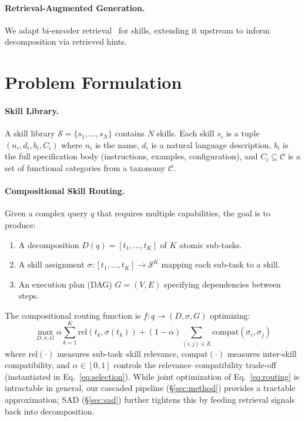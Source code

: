 \documentclass[11pt]{article}
\begin{document}
\paragraph{Retrieval-Augmented Generation.}
We adapt bi-encoder retrieval~\cite{karpukhin2020dense} for skills, extending it upstream to inform decomposition via retrieved hints.

\section{Problem Formulation}
\label{sec:problem}

\paragraph{Skill Library.}
A skill library $\mathcal{S} = \{s_1, \ldots, s_N\}$ contains $N$ skills.
Each skill $s_i$ is a tuple $(n_i, d_i, b_i, C_i)$ where $n_i$ is the name, $d_i$ is a natural language description, $b_i$ is the full specification body (instructions, examples, configuration), and $C_i \subseteq \mathcal{C}$ is a set of functional categories from a taxonomy $\mathcal{C}$.

\paragraph{Compositional Skill Routing.}
Given a complex query $q$ that requires multiple capabilities, the goal is to produce:
\begin{enumerate}[nosep,leftmargin=*]
  \item A decomposition $D(q) = [t_1, \ldots, t_K]$ of $K$ atomic sub-tasks.
  \item A skill assignment $\sigma: [t_1, \ldots, t_K] \to \mathcal{S}^K$ mapping each sub-task to a skill.
  \item An execution plan (DAG) $G = (V, E)$ specifying dependencies between steps.
\end{enumerate}

The compositional routing function is $f: q \to (D, \sigma, G)$ optimizing:
\begin{equation}
\max_{D, \sigma, G} \alpha \sum_{k=1}^{K} \text{rel}(t_k, \sigma(t_k)) + (1\!-\!\alpha) \!\!\!\sum_{(i,j) \in E}\!\!\! \text{compat}(\sigma_i, \sigma_j)
\label{eq:routing}
\end{equation}
where $\text{rel}(\cdot)$ measures sub-task--skill relevance, $\text{compat}(\cdot)$ measures inter-skill compatibility, and $\alpha \in [0, 1]$ controls the relevance--compatibility trade-off (instantiated in Eq.~\ref{eq:selection}).
While joint optimization of Eq.~\ref{eq:routing} is intractable in general, our cascaded pipeline (\S\ref{sec:method}) provides a tractable approximation; SAD (\S\ref{sec:sad}) further tightens this by feeding retrieval signals back into decomposition.
\end{document}
